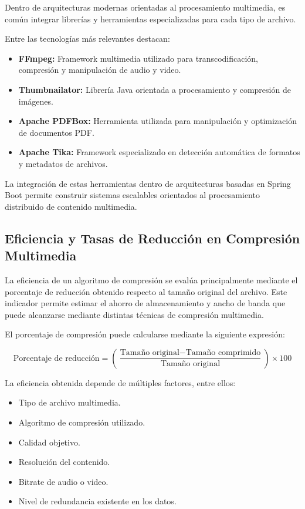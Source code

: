 \documentclass[12pt, oneside, letterpaper]{book}
\begin{document}
Dentro de arquitecturas modernas orientadas al procesamiento multimedia, es común integrar librerías y herramientas especializadas para cada tipo de archivo.

Entre las tecnologías más relevantes destacan:

\begin{itemize}

\item \textbf{FFmpeg:} Framework multimedia utilizado para transcodificación, compresión y manipulación de audio y video.

\item \textbf{Thumbnailator:} Librería Java orientada a procesamiento y compresión de imágenes.

\item \textbf{Apache PDFBox:} Herramienta utilizada para manipulación y optimización de documentos PDF.

\item \textbf{Apache Tika:} Framework especializado en detección automática de formatos y metadatos de archivos.
\end{itemize}

La integración de estas herramientas dentro de arquitecturas basadas en Spring Boot permite construir sistemas escalables orientados al procesamiento distribuido de contenido multimedia.


\subsection{Eficiencia y Tasas de Reducción en Compresión Multimedia}

La eficiencia de un algoritmo de compresión se evalúa principalmente mediante el porcentaje de reducción obtenido respecto al tamaño original del archivo. Este indicador permite estimar el ahorro de almacenamiento y ancho de banda que puede alcanzarse mediante distintas técnicas de compresión multimedia.

El porcentaje de compresión puede calcularse mediante la siguiente expresión:

\[
\text{Porcentaje de reducción} =
\left(
\frac{
\text{Tamaño original} -
\text{Tamaño comprimido}
}{
\text{Tamaño original}
}
\right)
\times 100
\]

La eficiencia obtenida depende de múltiples factores, entre ellos:

\begin{itemize}
\item Tipo de archivo multimedia.
\item Algoritmo de compresión utilizado.
\item Calidad objetivo.
\item Resolución del contenido.
\item Bitrate de audio o video.
\item Nivel de redundancia existente en los datos.
\end{itemize}
\end{document}
